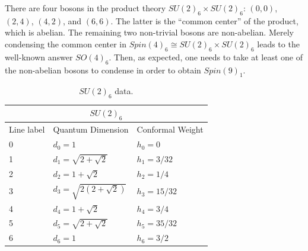 \documentclass[11pt]{article}
\numberwithin{equation}{section}
\begin{document}
There are four bosons in the product theory $SU(2)_{6} \times SU(2)_{6}$: $(0,0)$,  $(2,4)$, $(4,2)$, and $(6,6)$. The latter is the ``common center'' of the product, which is abelian. The remaining two non-trivial bosons are non-abelian. Merely condensing the common center in $Spin(4)_{6} \cong SU(2)_{6} \times SU(2)_{6}$ leads to the well-known answer $SO(4)_{6}$. Then, as expected, one needs to take at least one of the non-abelian bosons to condense in order to obtain $Spin(9)_{1}$.

\begin{table}[t]
\centering
\begin{tabular}[h]{|p{4cm}|p{4cm}|p{4cm}| }
\hline 
\multicolumn{3}{|c|}{$SU(2)_{6}$} \\
\hline
Line label & Quantum Dimension & Conformal Weight \\
\hline
0 & $d_{0} = 1$ & $h_{0}=0$ \\
1 & $d_{1} = \sqrt{2 + \sqrt{2}}$ & $h_{1}=3/32$ \\
2 & $d_{2} = 1 + \sqrt{2}$ & $h_{2}=1/4$ \\
3 & $d_{3} = \sqrt{2(2 + \sqrt{2})}$ & $h_{3}=15/32$ \\
4 & $d_{4} = 1 + \sqrt{2}$ & $h_{4}=3/4$ \\
5 & $d_{5} = \sqrt{2 + \sqrt{2}}$ & $h_{5}=35/32$ \\
6 & $d_{6} = 1$ & $h_{6}=3/2$ \\
\hline
\end{tabular}
\caption{$SU(2)_{6}$ data.}  \label{su2lv6table}
\end{table}
\end{document}

